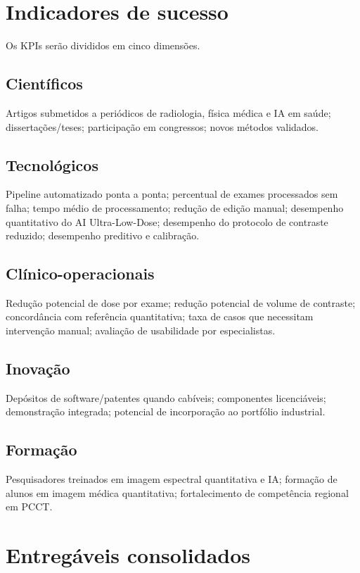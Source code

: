 \documentclass[11pt,a4paper]{article}
\begin{document}
\section{Indicadores de sucesso}

Os KPIs serão divididos em cinco dimensões.

\subsection{Científicos}
Artigos submetidos a periódicos de radiologia, física médica e IA em saúde; dissertações/teses; participação em congressos; novos métodos validados.

\subsection{Tecnológicos}
Pipeline automatizado ponta a ponta; percentual de exames processados sem falha; tempo médio de processamento; redução de edição manual; desempenho quantitativo do AI Ultra-Low-Dose; desempenho do protocolo de contraste reduzido; desempenho preditivo e calibração.

\subsection{Clínico-operacionais}
Redução potencial de dose por exame; redução potencial de volume de contraste; concordância com referência quantitativa; taxa de casos que necessitam intervenção manual; avaliação de usabilidade por especialistas.

\subsection{Inovação}
Depósitos de software/patentes quando cabíveis; componentes licenciáveis; demonstração integrada; potencial de incorporação ao portfólio industrial.

\subsection{Formação}
Pesquisadores treinados em imagem espectral quantitativa e IA; formação de alunos em imagem médica quantitativa; fortalecimento de competência regional em PCCT.

\section{Entregáveis consolidados}
\end{document}
